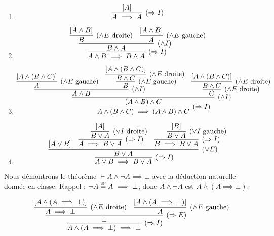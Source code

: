 \documentclass[12pt,french,a4paper]{article}
\newcommand\eqdef{\mathrel{\overset{\makebox[0pt]{\mbox{\normalfont\tiny\sffamily déf}}}{=}}}
\begin{document}
\begin{question}
\begin{enumerate}
\item
\[
\infer[(\Rightarrow{}I)] {A \implies A} {[A]}
\]

\item
\[
\infer[(\Rightarrow{}I)] {A\wedge B \implies B \wedge A} {
\infer[(\wedge I)] {B \wedge A} {
\infer[(\wedge E \text{ droite})] {B} {[A \wedge B]} & \infer[(\wedge E \text{ gauche})] {A} {[A \wedge B]}
}
}
\]

\newpage
\item
\[
\infer[(\Rightarrow{}I)] {A\wedge (B \wedge C) \implies (A\wedge B) \wedge C} {
\infer[(\wedge I)] {(A \wedge B) \wedge C} {
	\infer[(\wedge I)] {A \wedge B} {
\infer[(\wedge E \text{ gauche})] {A} {[A \wedge (B \wedge C)]} & \infer[(\wedge E \text{ gauche})] {B} {\infer[(\wedge E \text{ droite})] {B \wedge C} {[A \wedge (B \wedge C)]}} } & \infer[(\wedge E \text{ droite})] {C} {\infer[(\wedge E \text{ droite})] {B \wedge C} {[A \wedge (B \wedge C)]}} 
	}
}
\]

\item
\[
\infer[(\Rightarrow{}I)] {A\vee B \implies B \vee A} {
\infer[(\vee E)] {B \vee A}
	{
	[A \vee B]
	& \infer[(\Rightarrow{}I)] {A \implies B \vee A} {\infer[(\vee I \text{ droite})] {B \vee A} {[A]}} 
	& \infer[(\Rightarrow{}I)] {B \implies B \vee A} {\infer[(\vee I \text{ gauche})] {B \vee A} {[B]}} 
	}
}
\]

\end{enumerate}
\end{question}


\begin{question}
Nous démontrons le théorème $\vdash A \wedge \neg A \implies \bot$ avec la déduction naturelle donnée en classe. Rappel : $\neg A \eqdef A \implies \bot$, donc $A \wedge \neg A$ est $A \wedge (A \implies \bot)$.

\[
\infer[(\Rightarrow{}I)] {A \wedge (A \implies \bot) \implies \bot} {
\infer[(\Rightarrow{}E)] {\bot} {
\infer[(\wedge E \text{ droite})] {A \implies \bot} {[A \wedge (A \implies \bot)]} & \infer[(\wedge E \text{ gauche})] {A} {[A \wedge (A \implies \bot)]}
}}
\]

\end{question}
\end{document}
